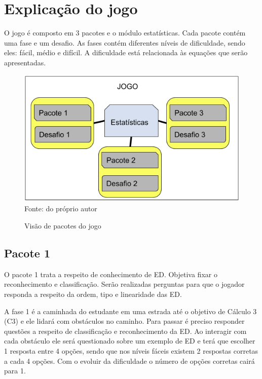\chapter[Explicação do jogo]{Explicação do jogo}
O jogo é composto em 3 pacotes e o módulo estatísticas. Cada pacote contém uma fase e um desafio. As fases contém diferentes níveis de dificuldade, sendo eles: fácil, médio e difícil. A dificuldade está relacionada às equações que serão apresentadas.

\begin{figure}[h!]
\centering
\caption{Visão de pacotes do jogo}
\includegraphics[scale=0.72]{figuras/pacote_jogo.png}
\label{pacoteDiagrama}
\small{Fonte: do próprio autor}
\end{figure}

\section[Pacote 1]{Pacote 1}
O pacote 1 trata a respeito de conhecimento de ED. Objetiva fixar o reconhecimento e classificação. Serão realizadas perguntas para que o jogador responda a respeito da ordem, tipo e linearidade das ED.

A fase 1 é a caminhada do estudante em uma estrada até o objetivo de Cálculo 3 (C3) e ele lidará com obstáculos no caminho. Para passar é preciso responder questões a respeito de classificação e reconhecimento da ED. Ao interagir com cada obstáculo ele será questionado sobre um exemplo de ED e terá que escolher 1 resposta entre 4 opções, sendo que nos níveis fáceis existem 2 respostas corretas a cada 4 opções. Com o evoluir da dificuldade o número de opções corretas cairá para 1. 

